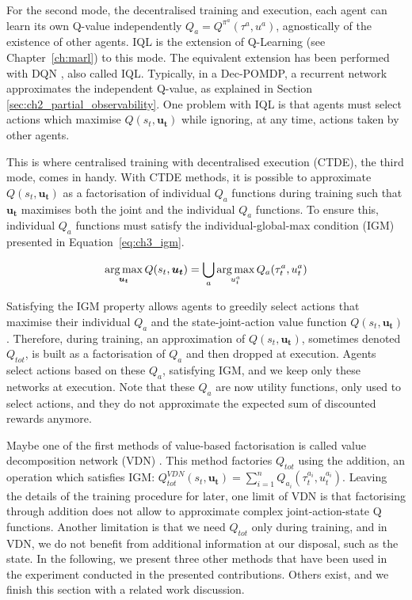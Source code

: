 For the second mode, the decentralised training and execution, each agent can learn its own Q-value independently $Q_a=Q^{\pi^a}(\tau^a, u^a)$, agnostically of the existence of other agents.
IQL \citep{Tan1993} is the extension of Q-Learning (see Chapter~\ref{ch:marl}) to this mode. 
The equivalent extension has been performed with DQN \citep{TampuuDqnIQL}, also called IQL.
Typically, in a Dec-POMDP, a recurrent network approximates the independent Q-value, as explained in Section \ref{sec:ch2_partial_observability}.
One problem with IQL is that agents must select actions which maximise $Q(s_t, \mathbf{u_t})$ while ignoring, at any time, actions taken by other agents.

This is where centralised training with decentralised execution (CTDE), the third mode, comes in handy.
With CTDE methods, it is possible to approximate $Q(s_t, \mathbf{u_t})$ as a factorisation of individual $Q_a$ functions during training such that $\mathbf{u_t}$ maximises both the joint and the individual $Q_a$ functions.
To ensure this, individual $Q_a$ functions must satisfy the individual-global-max condition (IGM) \citep{Son2019QTRAN:Learning} presented in Equation~\ref{eq:ch3_igm}.

\begin{equation}
    \argmax_{\mathbf{u_t}} Q(s_t, \mathbf{u_t}) =\bigcup_{a}\argmax_{u_t^{a}} Q_{a}(\tau_t^{a}, u_t^{a})
    \label{eq:ch3_igm}
\end{equation}

Satisfying the IGM property allows agents to greedily select actions that maximise their individual $Q_a$ and the state-joint-action value function $Q(s_t, \mathbf{u_t})$.
Therefore, during training, an approximation of $Q(s_t, \mathbf{u_t})$, sometimes denoted $Q_{tot}$, is built as a factorisation of $Q_a$ and then dropped at execution.
Agents select actions based on these $Q_a$, satisfying IGM, and we keep only these networks at execution.
Note that these $Q_a$ are now utility functions, only used to select actions, and they do not approximate the expected sum of discounted rewards anymore.

Maybe one of the first methods of value-based factorisation is called value decomposition network (VDN) \citep{sunehag2018vdn}.
This method factories $Q_{tot}$ using the addition, an operation which satisfies IGM: $Q_{tot}^{VDN}(s_t, \mathbf{u_t}) = \sum_{i=1}^n Q_{a_i}(\tau^{a_i}_t, u^{a_i}_t)$.
Leaving the details of the training procedure for later, one limit of VDN is that factorising through addition does not allow to approximate complex joint-action-state Q functions.
Another limitation is that we need $Q_{tot}$ only during training, and in VDN, we do not benefit from additional information at our disposal, such as the state.
In the following, we present three other methods that have been used in the experiment conducted in the presented contributions.
Others exist, and we finish this section with a related work discussion.

